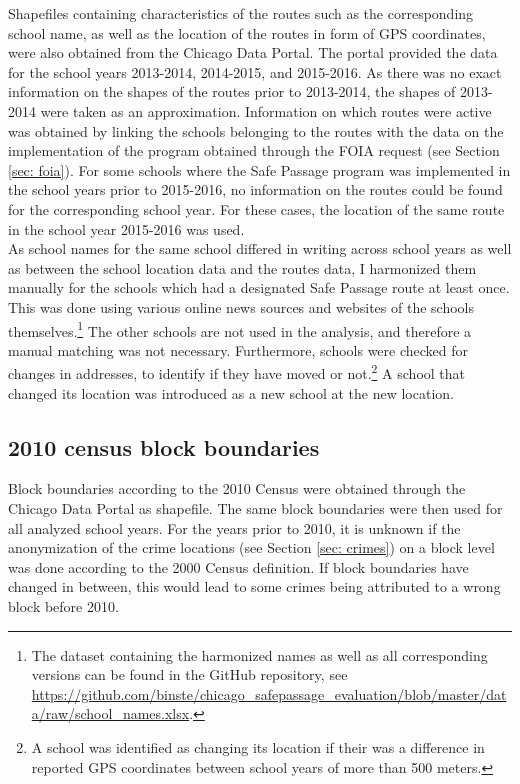\documentclass[]{article}
\begin{document}
Shapefiles containing characteristics of the routes such as the corresponding school name, as well as the location of the routes in form of GPS coordinates, were also obtained from the Chicago Data Portal. The portal provided the data for the school years 2013-2014, 2014-2015, and 2015-2016. As there was no exact information on the shapes of the routes prior to 2013-2014, the shapes of 2013-2014 were taken as an approximation. Information on which routes were active was obtained by linking the schools belonging to the routes with the data on the implementation of the program obtained through the FOIA request (see Section \ref{sec: foia}). For some schools where the Safe Passage program was implemented in the school years prior to 2015-2016, no information on the routes could be found for the corresponding school year. For these cases, the location of the same route in the school year 2015-2016 was used. \\

As school names for the same school differed in writing across school years as well as between the school location data and the routes data, I harmonized them manually for the schools which had a designated Safe Passage route at least once. This was done using various online news sources and websites of the schools themselves.\footnote{The dataset containing the harmonized names as well as all corresponding versions can be found in the GitHub repository, see \url{https://github.com/binste/chicago_safepassage_evaluation/blob/master/data/raw/school_names.xlsx}.} The other schools are not used in the analysis, and therefore a manual matching was not necessary. Furthermore, schools were checked for changes in addresses, to identify if they have moved or not.\footnote{A school was identified as changing its location if their was a difference in reported GPS coordinates between school years of more than 500 meters.} A school that changed its location was introduced as a new school at the new location.

\subsection{2010 census block boundaries}
Block boundaries according to the 2010 Census were obtained through the Chicago Data Portal as shapefile. The same block boundaries were then used for all analyzed school years. For the years prior to 2010, it is unknown if the anonymization of the crime locations (see Section \ref{sec: crimes}) on a block level was done according to the 2000 Census definition. If block boundaries have changed in between, this would lead to some crimes being attributed to a wrong block before 2010.
\end{document}
